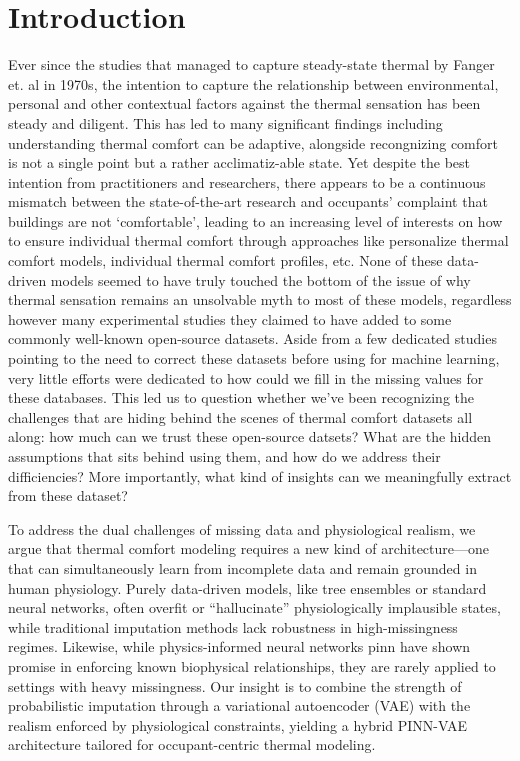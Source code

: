 \section{Introduction}\label{seg:intro}
Ever since the studies that managed to capture steady-state thermal by Fanger et. al in 1970s\cite{Fanger1970}, the intention to capture the relationship between environmental, personal and other contextual factors against the thermal sensation has been steady and diligent. This has led to many significant findings including understanding thermal comfort can be adaptive\cite{deDear1998Adaptive}, alongside recongnizing comfort is not a single point but a rather acclimatiz-able state. Yet despite the best intention from practitioners and researchers, there appears to be a continuous mismatch between the state-of-the-art research and occupants' complaint that buildings are not `comfortable', leading to an increasing level of interests on how to ensure individual thermal comfort through approaches like personalize thermal comfort models\cite{fang2022data}, individual thermal comfort profiles, etc\cite{ashrafi2022machine}. None of these data-driven models seemed to have truly touched the bottom of the issue of why thermal sensation remains an unsolvable myth to most of these models, regardless however many experimental studies they claimed to have added to some commonly well-known open-source datasets. Aside from a few dedicated studies pointing to the need to correct these datasets before using for machine learning\cite{quintana2024dataset}, very little efforts were dedicated to how could we fill in the missing values for these databases. This led us to question whether we've been recognizing the challenges that are hiding behind the scenes of thermal comfort datasets all along: how much can we trust these open-source datsets? What are the hidden assumptions that sits behind using them, and how do we address their difficiencies? More importantly, what kind of insights can we meaningfully extract from these dataset? 

To address the dual challenges of missing data and physiological realism, we argue that thermal comfort modeling requires a new kind of architecture—one that can simultaneously learn from incomplete data and remain grounded in human physiology. Purely data-driven models, like tree ensembles or standard neural networks, often overfit or “hallucinate” physiologically implausible states, while traditional imputation methods lack robustness in high-missingness regimes. Likewise, while physics-informed neural networks \gls{pinn} have shown promise in enforcing known biophysical relationships, they are rarely applied to settings with heavy missingness. Our insight is to combine the strength of probabilistic imputation through a variational autoencoder (VAE) with the realism enforced by physiological constraints, yielding a hybrid PINN-VAE architecture tailored for occupant-centric thermal modeling.

